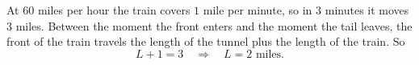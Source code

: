 At $60$ miles per hour the train covers $1$ mile per minute, so in $3$ minutes it moves $3$ miles. Between the moment the front enters and the moment the tail leaves, the front of the train travels the length of the tunnel plus the length of the train. So
\[
L+1=3\quad\Longrightarrow\quad L=\boxed{2\text{ miles}}.
\]
